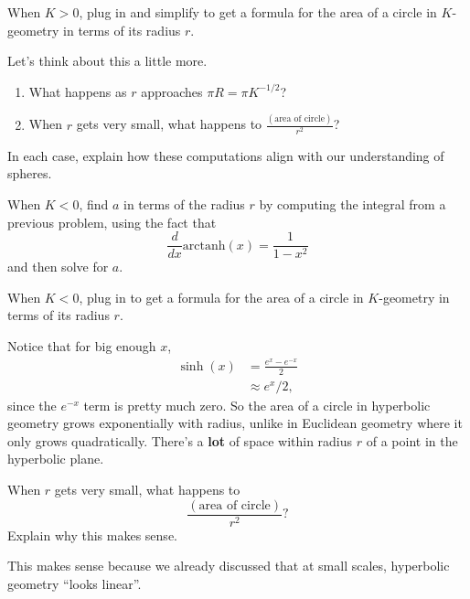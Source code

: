 \documentclass[newpage,hints,12pt,noauthor,nooutcomes]{ximera}
\begin{document}
\begin{problem}
  When $K>0$, plug in and simplify to get a formula for the area of a circle in
  $K$-geometry in terms of its radius $r$.
\end{problem}

\begin{problem}
  Let's think about this a little more.
  \begin{enumerate}
  \item What happens as $r$ approaches $\pi R=\pi K^{-1/2}$?
  \item When $r$ gets very small, what happens to $\frac{(\text{area of circle})}{r^2}$?
  \end{enumerate}
  In each case, explain how these computations align with our understanding of spheres.
\end{problem}

\begin{problem}
  When $K<0$, find $a$ in terms of the radius $r$ by computing the
  integral from a previous problem, using the fact that
  \[
  \frac{d}{dx}\mathrm{arctanh}(x)=\frac{1}{1-x^2}
  \]
  and then solve for $a$.

\end{problem}

\begin{problem}
  When $K<0$, plug in to get a formula for the area of a circle in $K$-geometry
  in terms of its radius $r$.
\end{problem}

Notice that for big enough $x$,
\begin{align*}
\sinh(x) &= \frac{e^x-e^{-x}}{2}\\
&\approx e^x/2,
\end{align*}
since the $e^{-x}$ term is pretty much zero.  So the area of a circle
in hyperbolic geometry grows exponentially with radius, unlike in
Euclidean geometry where it only grows quadratically.  There's a
\textbf{lot} of space within radius $r$ of a point in the hyperbolic
plane.


\begin{problem}
  When $r$ gets very small, what happens to
  \[
  \frac{(\text{area of circle})}{r^2}?
  \]
  Explain why this makes sense.
  \begin{freeResponse}
    This makes sense because we already discussed that at small scales,
    hyperbolic geometry ``looks linear''.
  \end{freeResponse}
\end{problem}
\end{document}
